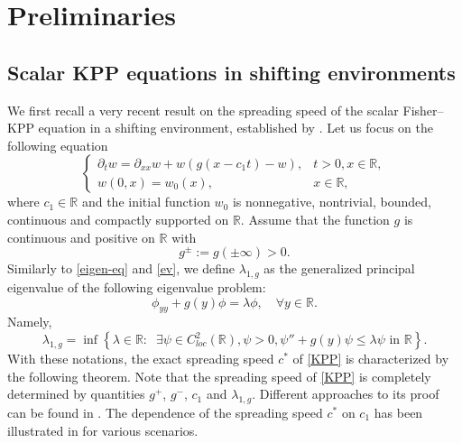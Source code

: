 \documentclass[10pt]{article}
\numberwithin{equation}{section}
\newcommand{\R}{\mathbb{R}}
\begin{document}
\section{Preliminaries}
\subsection{Scalar KPP equations in shifting environments}
We first recall  a very recent result   
on the spreading speed of the scalar Fisher--KPP equation in a shifting environment, established by \cite{GGM2024,LNY2024}. 
Let us focus on the following equation
\begin{equation}\label{KPP}
\begin{cases}
\partial_t w = \partial_{xx} w + w \left(g(x-c_1 t) -w  \right), &t>0, x\in \R, \\
w(0, x)= w_0(x), &x\in\R,
\end{cases}
\end{equation}
where $c_1 \in \R$ and the initial function $w_0$ is   nonnegative, nontrivial, bounded, continuous and compactly supported on $\R$.  
Assume that the function $g$ is continuous  and  positive on $\R$ with 
\begin{equation*}
g^{\pm}:=  g(\pm \infty) >0.
\end{equation*} 
Similarly to \eqref{eigen-eq} and \eqref{ev}, we define $\lambda_{1,g}$ as the generalized principal eigenvalue of the  following eigenvalue problem:
\begin{equation*}
\phi_{yy} + g(y) \phi = \lambda \phi,  \quad \forall  y\in \R.
\end{equation*}
Namely, 
\begin{equation*}
\lambda_{1,g}= \inf\left\{ \lambda \in \R: \;\;  \exists \psi \in C^2_{loc} (\R), \psi>0,  \psi'' +g(y) \psi \leq \lambda \psi \text{ in } \R  \right\}.
\end{equation*}
With these notations,   the exact spreading speed $c^*$  of \eqref{KPP} is characterized  by  the  following theorem. Note that the spreading speed of \eqref{KPP}   is completely  determined by  quantities $g^{+}$, $g^{-}$, $c_1$ and $\lambda_{1,g}$.  Different approaches to its proof can be found in \cite{GGM2024, LNY2024}. The dependence  of the spreading speed   $c^*$ on $c_1$ has been illustrated  in \cite{GGM2024, LNY2024} for various scenarios.
\end{document}
